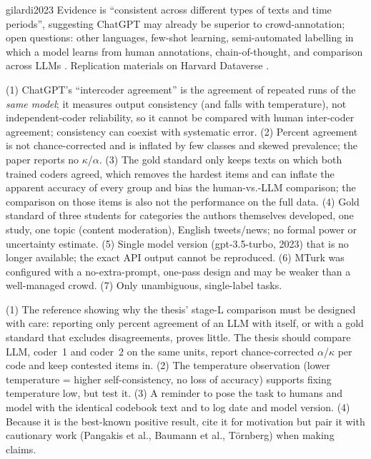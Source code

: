 \begin{papercard}{gilardi2023}
 Evidence is ``consistent across different types of texts and time periods'', suggesting ChatGPT may already be superior to crowd-annotation; open questions: other languages, few-shot learning, semi-automated labelling in which a model learns from human annotations, chain-of-thought, and comparison across LLMs . Replication materials on Harvard Dataverse .

 (1) ChatGPT's ``intercoder agreement'' is the agreement of repeated runs of the \emph{same model}; it measures output consistency (and falls with temperature), not independent-coder reliability, so it cannot be compared with human inter-coder agreement; consistency can coexist with systematic error. (2) Percent agreement is not chance-corrected and is inflated by few classes and skewed prevalence; the paper reports no $\kappa$/$\alpha$. (3) The gold standard only keeps texts on which both trained coders agreed, which removes the hardest items and can inflate the apparent accuracy of every group and bias the human-vs.-LLM comparison; the comparison on those items is also not the performance on the full data. (4) Gold standard of three students for categories the authors themselves developed, one study, one topic (content moderation), English tweets/news; no formal power or uncertainty estimate. (5) Single model version (gpt-3.5-turbo, 2023) that is no longer available; the exact API output cannot be reproduced. (6) MTurk was configured with a no-extra-prompt, one-pass design and may be weaker than a well-managed crowd. (7) Only unambiguous, single-label tasks.

 (1) The reference showing why the thesis' stage-L comparison must be designed with care: reporting only percent agreement of an LLM with itself, or with a gold standard that excludes disagreements, proves little. The thesis should compare LLM, coder~1 and coder~2 on the same units, report chance-corrected $\alpha$/$\kappa$ per code and keep contested items in. (2) The temperature observation (lower temperature = higher self-consistency, no loss of accuracy) supports fixing temperature low, but test it. (3) A reminder to pose the task to humans and model with the identical codebook text and to log date and model version. (4) Because it is the best-known positive result, cite it for motivation but pair it with cautionary work (Pangakis et al., Baumann et al., Törnberg) when making claims.
\end{papercard}
